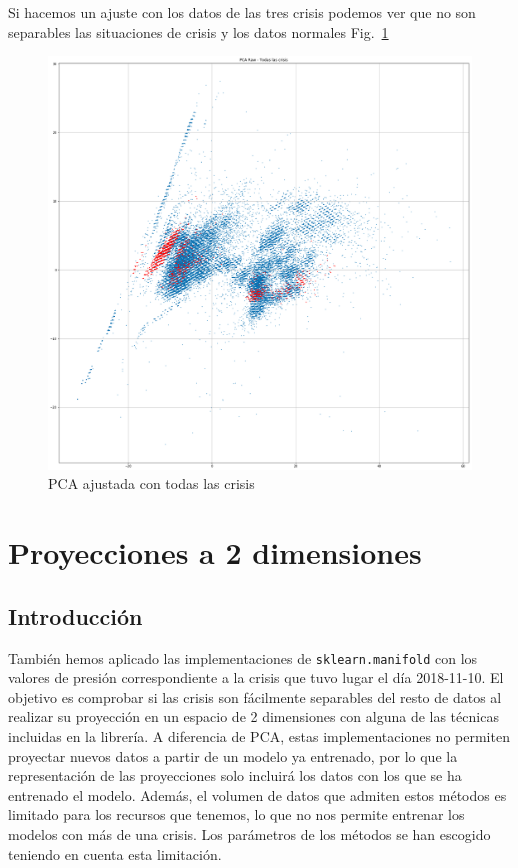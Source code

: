 \documentclass[a4paper,12pt,twoside,oldfontcommands]{memoir}
\begin{document}
Si hacemos un ajuste con los datos de las tres crisis podemos ver que no son separables las situaciones de crisis y los datos normales Fig.~\ref{fig:pca_crisis_full}
\begin{figure}
    \centering
    \includegraphics[width=\textwidth]{images/PCA-crisisFull.png}
    \caption{PCA ajustada con todas las crisis}
    \label{fig:pca_crisis_full}
\end{figure}
\chapter{Proyecciones a 2 dimensiones}
\section{Introducción}
También hemos aplicado las implementaciones de \texttt{sklearn.manifold} con los valores de presión correspondiente a la crisis que tuvo lugar el día 2018-11-10. El objetivo es comprobar si las crisis son fácilmente separables del resto de datos al realizar su proyección en un espacio de 2 dimensiones con alguna de las técnicas incluidas en la librería. A diferencia de PCA, estas implementaciones no permiten proyectar nuevos datos a partir de un modelo ya entrenado, por lo que la representación de las proyecciones solo incluirá los datos con los que se ha entrenado el modelo. Además, el volumen de datos que admiten estos métodos es limitado para los recursos que tenemos, lo que no nos permite entrenar los modelos con más de una crisis. Los parámetros de los métodos se han escogido teniendo en cuenta esta limitación. 
\end{document}
